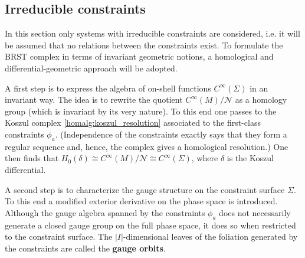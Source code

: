 \subsection{Irreducible constraints}

    In this section only systems with irreducible constraints are considered, i.e. it will be assumed that no relations between the constraints exist. To formulate the BRST complex in terms of invariant geometric notions, a homological and differential-geometric approach will be adopted.

    A first step is to express the algebra of on-shell functions $C^\infty(\Sigma)$ in an invariant way. The idea is to rewrite the quotient $C^\infty(M)/\mathcal{N}$ as a homology group (which is invariant by its very nature). To this end one passes to the Koszul complex \ref{homalg:koszul_resolution} associated to the first-class constraints $\phi_a$. (Independence of the constraints exactly says that they form a regular sequence and, hence, the complex gives a homological resolution.) One then finds that $H_0(\delta)\cong C^\infty(M)/\mathcal{N}\cong C^\infty(\Sigma)$, where $\delta$ is the Koszul differential.

    A second step is to characterize the gauge structure on the constraint surface $\Sigma$. To this end a modified exterior derivative on the phase space is introduced. Although the gauge algebra spanned by the constraints $\phi_a$ does not necessarily generate a closed gauge group on the full phase space, it does so when restricted to the constraint surface. The $|I|$-dimensional leaves of the foliation generated by the constraints are called the \textbf{gauge orbits}.

